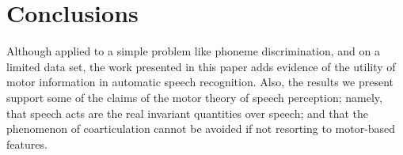 \section{Conclusions}
\label{sec:concl}

Although applied to a simple problem like phoneme discrimination, and on a
limited data set, the work presented in this paper adds evidence of the utility 
of motor information in automatic speech recognition. Also,
the results we present support some of the claims of the motor theory
of speech perception; namely, that speech acts are the real invariant
quantities over speech; and that the phenomenon of coarticulation cannot
be avoided if not resorting to motor-based features.




